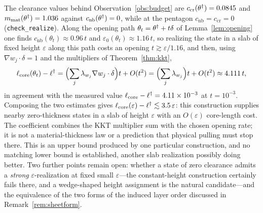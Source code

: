 \begin{remark}\label{rem:slabnumerics}
The clearance values behind Observation~\ref{obs:budget} are $c_{\mathrm{cr}}(\theta^\dagger)=0.0845$ and $m_{\mathrm{mat}}(\theta^\dagger)=1.036$ against $c_{\mathrm{nb}}(\theta^\dagger)=0$, while at the pentagon $c_{\mathrm{nb}}=c_{\mathrm{cr}}=0$ (\texttt{check\_realize}). Along the opening path $\theta_t=\theta^\dagger+t\delta$ of Lemma~\ref{lem:opening} one finds $c_{\mathrm{nb}}(\theta_t)\approx0.96\,t$ and $\varepsilon_0(\theta_t)\approx1.16\,t$, so realizing the state in a slab of fixed height $\varepsilon$ along this path costs an opening $t\gtrsim\varepsilon/1.16$, and then, using $\nabla w_j\cdot\delta=1$ and the multipliers of Theorem~\ref{thm:kkt},
\[
  \ell_{\mathrm{core}}(\theta_t)-\ell^\dagger=\Bigl(\sum_j\lambda_{w_j}\nabla w_j\cdot\delta\Bigr)t+O(t^2)
  =\Bigl(\sum_j\lambda_{w_j}\Bigr)t+O(t^2)\approx4.111\,t ,
\]
in agreement with the measured value $\ell_{\mathrm{core}}-\ell^\dagger=4.11\times10^{-3}$ at $t=10^{-3}$. Composing the two estimates gives $\ell_{\mathrm{core}}(\varepsilon)-\ell^\dagger\lesssim3.5\,\varepsilon$: this construction supplies nearby zero-thickness states in a slab of height $\varepsilon$ with an $O(\varepsilon)$ core-length cost. The coefficient combines the KKT multiplier sum with the chosen opening rate; it is not a material-thickness law or a prediction that physical pulling must stop there. This is an upper bound produced by one particular construction, and no matching lower bound is established, another slab realization possibly doing better. Two further points remain open: whether a state of zero clearance admits a \emph{strong} $\varepsilon$-realization at fixed small $\varepsilon$---the constant-height construction certainly fails there, and a wedge-shaped height assignment is the natural candidate---and the equivalence of the two forms of the induced layer order discussed in Remark~\ref{rem:sheetform}.
\end{remark}
